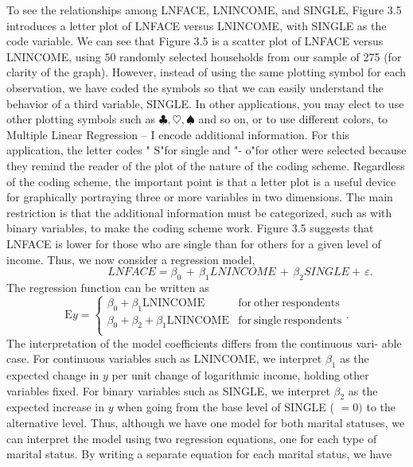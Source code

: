 \documentclass[11pt]{article}
\begin{document}
 To see the relationships among LNFACE, LNINCOME, and SINGLE, Figure 3.5
introduces a letter plot of LNFACE versus LNINCOME, with SINGLE as the
code variable. We can see that Figure 3.5 is a scatter plot of LNFACE versus
LNINCOME, using \(5 0\) randomly selected households from our sample of 275
(for clarity of the graph). However, instead of using the same plotting symbol for
 each observation, we have coded the symbols so that we can easily understand the
behavior of a third variable, SINGLE. In other applications, you may elect to use
 other plotting symbols such as \(\clubsuit, \heartsuit, \spadesuit\) and so on, or to use different colors, to
 Multiple Linear Regression -- I
encode additional information. For this application, the letter codes " S"for single
and "- o"for other were selected because they remind the reader of the plot of the
nature of the coding scheme. Regardless of the coding scheme, the important
point is that a letter plot is a useful device for graphically portraying three or
more variables in two dimensions. The main restriction is that the additional
information must be categorized, such as with binary variables, to make the
coding scheme work.
Figure 3.5 suggests that LNFACE is lower for those who are single than for
others for a given level of income. Thus, we now consider a regression model,
\[
\qquad\qquad\qquad L N F A C E=\beta_{0} \,+\, \beta_{1} L N I N C O M E \,+\, \beta_{2} S I N G L E+\, \varepsilon.
\]
 The regression function can
be written as
\[
\textrm{E} y=\begin{cases} {\beta_{0}+\beta_{1} \mathrm{L N I N C O M E}} & {\mathrm{f o r ~ o t h e r ~ r e s p o n d e n t s}} \\ {\beta_{0}+\beta_{2}+\beta_{1} \mathrm{L N I N C O M E}} & {\mathrm{f o r ~ s i n g l e ~ r e s p o n d e n t s}} \\ \end{cases} .
\]
The interpretation of the model coefficients differs from the continuous vari-
able case. For continuous variables such as LNINCOME, we interpret \(\beta_{1}\) as
the expected change in \(y\) per unit change of logarithmic income, holding other
variables fixed. For binary variables such as SINGLE, we interpret \(\beta_{2}\) as the
expected increase in \(y\) when going from the base level of SINGLE ( \(= 0 )\) to the
 alternative level. Thus, although we have one model for both marital statuses,
we can interpret the model using two regression equations, one for each type of
marital status. By writing a separate equation for each marital status, we have
\end{document}
